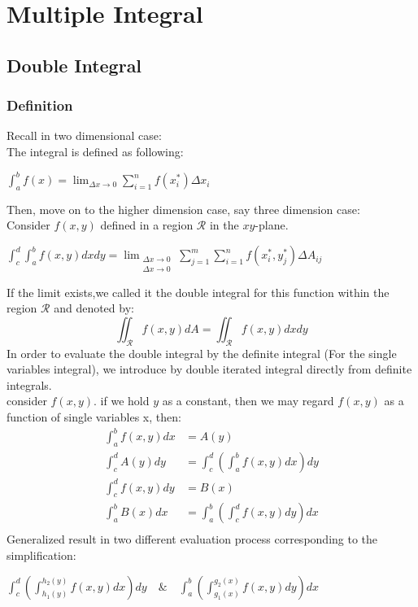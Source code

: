 \documentclass[UTF8,a4paper, 10pt, openany]{book}
\begin{document}
\chapter{Multiple Integral}
\section{Double Integral}
\subsection{Definition}
Recall in two dimensional case:\\
The integral is defined as following:
\begin{center}
$\displaystyle\int_{a}^{b}f(x)=\lim_{\Delta x\to 0}\displaystyle\sum_{i=1}^{n} f(x_i^*)\Delta x_i$
\end{center}
Then, move on to the higher dimension case, say three dimension case:\\
Consider $f(x,y)$ defined in a region $\mathcal{R}$ in the $xy$-plane.
\begin{center}
$\displaystyle\int_{c}^{d}\displaystyle\int_{a}^{b}f(x,y)dxdy =\lim_{\substack{\Delta x\to 0\\ \Delta x\to 0}}\displaystyle\sum_{j=1}^{m}\displaystyle\sum_{i=1}^{n} f(x_i^*,y_j^*)\Delta A_{ij}$
\end{center}
If the limit exists,we called it the double integral for this function within the region $\mathcal{R}$ and denoted by:
\begin{equation}
\boxed{\iint_{\mathcal{R}}f(x,y)dA=\iint_{\mathcal{R}}f(x,y)dxdy}
\end{equation}
In order to evaluate the double integral by the definite integral (For the single variables integral), we introduce by double iterated integral directly from definite integrals.\\
consider $f(x,y)$. if we hold $y$ as a constant, then we may regard $f(x,y)$ as a function of single variables x, then:
\begin{align*}
\displaystyle\int_{a}^{b}f(x,y)dx &= A(y)\\
\displaystyle\int_{c}^{d}A(y)dy &= \displaystyle\int_{c}^{d}\left(\displaystyle\int_{a}^{b}f(x,y)dx\right)dy\\
\displaystyle\int_{c}^{d}f(x,y)dy &= B(x)\\
\displaystyle\int_{a}^{b}B(x)dx &= \displaystyle\int_{a}^{b}\left(\displaystyle\int_{c}^{d}f(x,y)dy\right)dx\\
\end{align*}
Generalized result in two different evaluation process corresponding to the simplification:
\begin{center}
$\boxed{\displaystyle\int_{c}^{d}\left(\displaystyle\int_{h_1(y)}^{h_2(y)}f(x,y)dx\right)dy \quad \& \quad \displaystyle\int_{a}^{b}\left(\displaystyle\int_{g_1(x)}^{g_2(x)}f(x,y)dy\right)dx}$
\end{center}
\end{document}
